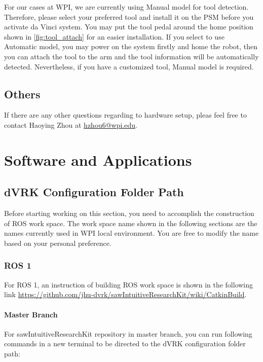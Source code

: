 For our cases at WPI, we are currently using Manual model for tool detection. Therefore, please select your preferred tool and install it on the PSM before you activate da Vinci system. You may put the tool pedal around the home position shown in \autoref{fig:tool_attach} for an easier installation. If you select to use Automatic model, you may power on the system firstly and home the robot, then you can attach the tool to the arm and the tool information will be automatically detected. Nevertheless, if you have a customized tool, Manual model is required.

\section{Others}

If there are any other questions regarding to hardware setup, pleas feel free to contact Haoying Zhou at \href{mailto:hzhou6@wpi.edu}{hzhou6@wpi.edu}.

\newpage

\chapter{Software and Applications}
\label{ch: Software}

\section{dVRK Configuration Folder Path}

Before starting working on this section, you need to accomplish the construction of ROS work space. The work space name shown in the following sections are the names currently used in WPI local environment. You are free to modify the name based on your personal preference.

\subsection{ROS 1}

For ROS 1, an instruction of building ROS work space is shown in the following link \url{https://github.com/jhu-dvrk/sawIntuitiveResearchKit/wiki/CatkinBuild}.

\subsubsection{Master Branch}

For sawIntuitiveResearchKit repository in master branch, you can run following commands in a new terminal to be directed to the dVRK configuration folder path:

